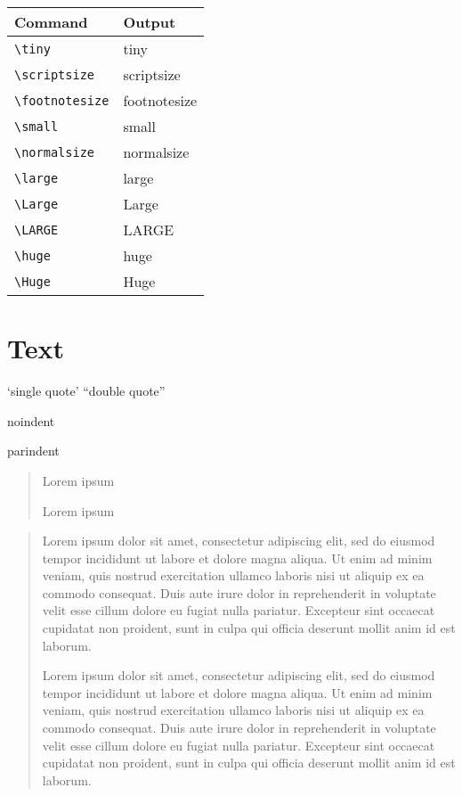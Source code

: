 \begin{tabular}{l|l}
  Command              & Output                       \\\hline
  \verb|\tiny|         & {\tiny tiny}                 \\
  \verb|\scriptsize|   & {\scriptsize scriptsize}     \\
  \verb|\footnotesize| & {\footnotesize footnotesize} \\
  \verb|\small|        & {\small small}               \\
  \verb|\normalsize|   & {\normalsize normalsize}     \\
  \verb|\large|        & {\large large}               \\
  \verb|\Large|        & {\Large Large}               \\
  \verb|\LARGE|        & {\LARGE LARGE}               \\
  \verb|\huge|         & {\huge huge}                 \\
  \verb|\Huge|         & {\Huge Huge}                 \\
\end{tabular}

\section{Text}

`single quote' ``double quote''

{
  \noindent
  noindent
}

{
  \setlength{\parindent}{1em}
  parindent
}

\begin{quote}
  Lorem ipsum

  Lorem ipsum
\end{quote}

\begin{quotation}
  Lorem ipsum dolor sit amet, consectetur adipiscing elit, sed do eiusmod tempor incididunt ut labore et dolore magna aliqua. Ut enim ad minim veniam, quis nostrud exercitation ullamco laboris nisi ut aliquip ex ea commodo consequat. Duis aute irure dolor in reprehenderit in voluptate velit esse cillum dolore eu fugiat nulla pariatur. Excepteur sint occaecat cupidatat non proident, sunt in culpa qui officia deserunt mollit anim id est laborum.

  Lorem ipsum dolor sit amet, consectetur adipiscing elit, sed do eiusmod tempor incididunt ut labore et dolore magna aliqua. Ut enim ad minim veniam, quis nostrud exercitation ullamco laboris nisi ut aliquip ex ea commodo consequat. Duis aute irure dolor in reprehenderit in voluptate velit esse cillum dolore eu fugiat nulla pariatur. Excepteur sint occaecat cupidatat non proident, sunt in culpa qui officia deserunt mollit anim id est laborum.
\end{quotation}


